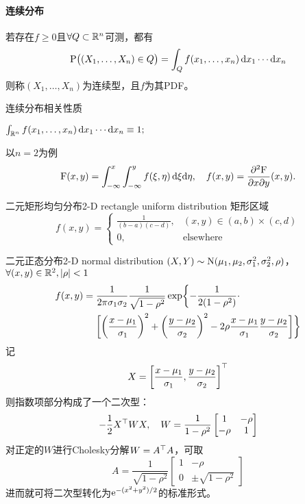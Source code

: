 \paragraph{连续分布}若存在$f\geqslant 0$且$\forall Q\subset\mathbb R^n$可测，都有
\[
	\operatorname{P}\bigl((X_1,\ldots,X_n)\in Q\bigr)=\int_Qf(x_1,\ldots,x_n)\mathop{}\!\mathrm{d} x_1\cdots\mathop{}\!\mathrm{d} x_n
\]
则称$(X_1,\ldots,X_n)$为连续型，且$f$为其PDF。
\begin{theorem}{连续分布相关性质}{}
	\begin{compactenum}
		\item $\int_{\mathbb R^n}f(x_1,\ldots,x_n)\mathop{}\!\mathrm{d} x_1\cdots\mathop{}\!\mathrm{d} x_n\equiv 1;$
		\item 以$n=2$为例
		\[
			\operatorname{F}(x,y)=\int_{-\infty}^x\int_{-\infty}^yf(\xi,\eta)\mathop{}\!\mathrm{d}\xi\mathrm{d}\eta,\quad f(x,y)=\frac{\partial^2 \!\operatorname{F}}{\partial x\partial y}(x,y).
		\]
	\end{compactenum}
\end{theorem}
\begin{example}{二元矩形均匀分布}{2-D rectangle uniform distribution}
	矩形区域
	\[
		f(x,y)=\begin{cases}
			\frac1{(b-a)(c-d)},&(x,y)\in(a,b)\times(c,d)\\
			0,&\text{elsewhere}
		\end{cases}
	\]
\end{example}
\begin{example}{二元正态分布}{2-D normal distribution}
	$(X,Y)\sim\operatorname{N}(\mu_1,\mu_2,\sigma_1^2,\sigma_2^2,\rho)$，$\forall(x,y)\in\mathbb R^2,\left\lvert\rho\right\rvert<1$
	\begin{align}
		\begin{aligned}
			f(x,y)={}&\frac1{2\pi\sigma_1\sigma_2}\frac1{\sqrt{1-\rho^2}}\exp\biggl\{-\frac1{2(1-\rho^2)}\cdot\\
			&\biggl[\biggl(\frac{x-\mu_1}{\sigma_1}\biggr)^2+\biggl(\frac{y-\mu_2}{\sigma_2}\biggr)^2-2\rho\frac{x-\mu_1}{\sigma_1}\frac{y-\mu_2}{\sigma_2}\biggr]\biggr\}
		\end{aligned}
	\end{align}
	记
	\[
		X=\left[\frac{x-\mu_1}{\sigma_1},\frac{y-\mu_2}{\sigma_2}\right]^\top
	\]
	则指数项部分构成了一个二次型：
	\[
		-\frac12X^\top WX,\quad W=\frac1{1-\rho^2}\begin{bmatrix}
			1&-\rho\\-\rho&1
		\end{bmatrix}
	\]
	对正定的$W$进行Cholesky分解$W=A^\top A$，可取
	\[
		A=\frac1{\sqrt{1-\rho^2}}\begin{bmatrix}
			1&-\rho\\0&\pm\sqrt{1-\rho^2}
		\end{bmatrix}
	\]
	进而就可将二次型转化为$\mathop{}\!\mathrm{e}^{-(x^2+y^2)/2}$的标准形式。
\end{example}
